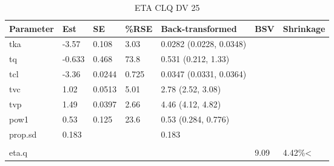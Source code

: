 \begin{table}
\centering\centering
\caption{ETA CLQ DV 25}
\centering
\fontsize{8}{10}\selectfont
\begin{tabular}[t]{lllllll}
\toprule
\textbf{Parameter} & \textbf{Est} & \textbf{SE} & \textbf{\%RSE} & \textbf{Back-transformed} & \textbf{BSV} & \textbf{Shrinkage}\\
\midrule
tka & -3.57 & 0.108 & 3.03 & 0.0282 (0.0228, 0.0348) &  & \\
\midrule
tq & -0.633 & 0.468 & 73.8 & 0.531 (0.212, 1.33) &  & \\
\midrule
tcl & -3.36 & 0.0244 & 0.725 & 0.0347 (0.0331, 0.0364) &  & \\
\midrule
tvc & 1.02 & 0.0513 & 5.01 & 2.78 (2.52, 3.08) &  & \\
\midrule
tvp & 1.49 & 0.0397 & 2.66 & 4.46 (4.12, 4.82) &  & \\
\midrule
pow1 & 0.53 & 0.125 & 23.6 & 0.53 (0.284, 0.776) &  & \\
\midrule
prop.sd & 0.183 &  &  & 0.183 &  & \\
\midrule\\
eta.q &  &  &  &  & 9.09 & 4.42\%<\\
\bottomrule
\end{tabular}
\end{table}